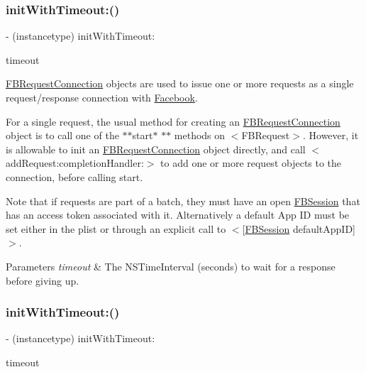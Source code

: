 \subsubsection{\texorpdfstring{init\+With\+Timeout\+:()}{initWithTimeout:()}\hspace{0.1cm}{\footnotesize\ttfamily [1/5]}}
{\footnotesize\ttfamily -\/ (instancetype) init\+With\+Timeout\+: \begin{DoxyParamCaption}\item[{(N\+S\+Time\+Interval)}]{timeout }\end{DoxyParamCaption}}

{\ttfamily \hyperlink{interfaceFBRequestConnection}{F\+B\+Request\+Connection}} objects are used to issue one or more requests as a single request/response connection with \hyperlink{interfaceFacebook}{Facebook}.

For a single request, the usual method for creating an {\ttfamily \hyperlink{interfaceFBRequestConnection}{F\+B\+Request\+Connection}} object is to call one of the $\ast$$\ast$start$\ast$ $\ast$$\ast$ methods on $<$\+F\+B\+Request$>$. However, it is allowable to init an {\ttfamily \hyperlink{interfaceFBRequestConnection}{F\+B\+Request\+Connection}} object directly, and call $<$add\+Request\+:completion\+Handler\+:$>$ to add one or more request objects to the connection, before calling start.

Note that if requests are part of a batch, they must have an open \hyperlink{interfaceFBSession}{F\+B\+Session} that has an access token associated with it. Alternatively a default App ID must be set either in the plist or through an explicit call to $<$\mbox{[}\hyperlink{interfaceFBSession}{F\+B\+Session} default\+App\+ID\mbox{]}$>$.


\begin{DoxyParams}{Parameters}
{\em timeout} & The {\ttfamily N\+S\+Time\+Interval} (seconds) to wait for a response before giving up. \\
\hline
\end{DoxyParams}
\mbox{\label{interfaceFBRequestConnection_a00435ea153b22e8613108afdbabcadff}} 
\subsubsection{\texorpdfstring{init\+With\+Timeout\+:()}{initWithTimeout:()}\hspace{0.1cm}{\footnotesize\ttfamily [2/5]}}
{\footnotesize\ttfamily -\/ (instancetype) init\+With\+Timeout\+: \begin{DoxyParamCaption}\item[{(N\+S\+Time\+Interval)}]{timeout }\end{DoxyParamCaption}}

